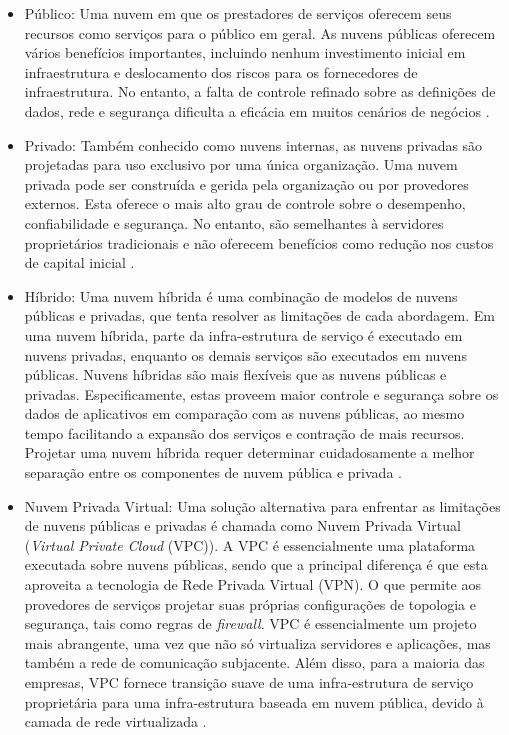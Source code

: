 \begin{itemize}
  \item Público: Uma nuvem em que os prestadores de serviços oferecem seus recursos como serviços para o público em geral. As nuvens públicas oferecem vários benefícios importantes, incluindo nenhum investimento inicial em infraestrutura e deslocamento dos riscos para os fornecedores de infraestrutura. No entanto, a falta de controle refinado sobre as definições de dados, rede e segurança dificulta a eficácia em muitos cenários de negócios \cite{JISA2010}.
  
  \item Privado:  Também conhecido como nuvens internas, as nuvens privadas são projetadas para uso exclusivo por uma única organização. Uma nuvem privada pode ser construída e gerida pela organização ou por provedores externos. Esta oferece o mais alto grau de controle sobre o desempenho, confiabilidade e segurança. No entanto, são semelhantes à servidores proprietários tradicionais e não oferecem benefícios como redução nos custos de capital inicial \cite{JISA2010}.
  
  \item Híbrido: Uma nuvem híbrida é uma combinação de modelos de nuvens públicas e privadas, que tenta resolver as limitações de cada abordagem. Em uma nuvem híbrida, parte da infra-estrutura de serviço é executado em nuvens privadas, enquanto os demais serviços são executados em nuvens públicas. Nuvens híbridas são mais flexíveis que as nuvens públicas e privadas. Especificamente, estas proveem maior controle e segurança sobre os dados de aplicativos em comparação com as nuvens públicas, ao mesmo tempo facilitando a expansão dos serviços e contração de mais recursos. Projetar uma nuvem híbrida requer determinar cuidadosamente a melhor separação entre os componentes de nuvem pública e privada \cite{JISA2010}.
  
  \item Nuvem Privada Virtual: Uma solução alternativa para enfrentar as limitações de nuvens públicas e privadas é chamada como Nuvem Privada Virtual (\textit{Virtual Private Cloud} (VPC)). A VPC é essencialmente uma plataforma executada sobre nuvens públicas, sendo que a principal diferença é que esta aproveita a tecnologia de Rede Privada Virtual (VPN). O que permite aos provedores de serviços projetar suas próprias configurações de topologia e segurança, tais como regras de \textit{firewall}. VPC é essencialmente um projeto mais abrangente, uma vez que não só virtualiza servidores e aplicações, mas também a rede de comunicação subjacente. Além disso, para a maioria das empresas, VPC fornece transição suave de uma infra-estrutura de serviço proprietária para uma infra-estrutura baseada em nuvem pública, devido à camada de rede virtualizada \cite{JISA2010}.
  
\end{itemize}

